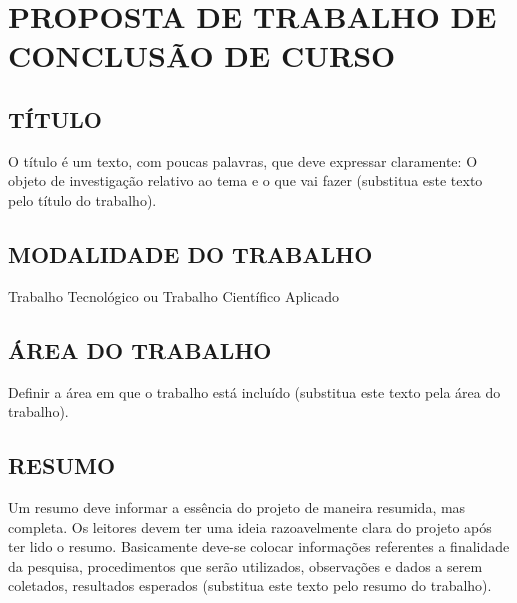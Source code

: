 
\chapter{PROPOSTA DE TRABALHO DE CONCLUSÃO DE CURSO}
\label{chap:proposta}

\section{TÍTULO}
\label{sec:titulo}
O título é um texto, com poucas palavras, que deve expressar claramente: O objeto de investigação relativo ao tema e o que vai fazer (substitua este texto pelo título do trabalho).

\section{MODALIDADE DO TRABALHO}
\label{sec:modalidade}
Trabalho Tecnológico ou Trabalho Científico Aplicado

\section{ÁREA DO TRABALHO}
\label{sec:area}
Definir a área em que o trabalho está incluído (substitua este texto pela área do trabalho).

\section{RESUMO}
\label{sec:resumo}
Um resumo deve informar a essência do projeto de maneira resumida, mas completa. Os leitores devem ter uma ideia razoavelmente clara do projeto após ter lido o resumo. Basicamente deve-se colocar informações referentes a finalidade da pesquisa, procedimentos que serão utilizados, observações e dados a serem coletados, resultados esperados (substitua este texto pelo resumo do trabalho).

